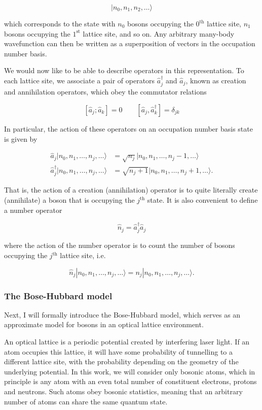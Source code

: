 \documentclass[11pt]{article}
\begin{document}
\[| n_0 ,n_1,n_2,\ldots \rangle\]

which corresponds to the state with \(n_0\) bosons occupying the
\(0^\text{th}\) lattice site, \(n_1\) bosons occupying the
\(1^\text{st}\) lattice site, and so on. Any arbitrary many-body
wavefunction can then be written as a superposition of vectors in the
occupation number basis.

We would now like to be able to describe operators in this
representation. To each lattice site, we associate a pair of operators
\(\hat a_j^\dagger\) and \(\hat a_j\), known as creation and
annihilation operators, which obey the commutator relations

\[[ \hat a_j ;  \hat a_k] = 0  \qquad [ \hat a_j, \hat a_k^\dagger] = \delta_{jk}\]

In particular, the action of these operators on an occupation number
basis state is given by

\begin{align}
\hat a_j | n_0,n_1, \ldots,n_j ,\ldots \rangle &= \sqrt{n_j} | n_0,n_1, \ldots,n_j-1 ,\ldots \rangle \\
\hat a_j^\dagger | n_0,n_1, \ldots,n_j ,\ldots \rangle &= \sqrt{n_j+1} | n_0,n_1, \ldots,n_j +1,\ldots \rangle .
\end{align}

That is, the action of a creation (annihilation) operator is to quite
literally create (annihilate) a boson that is occupying the
\(j^\text{th}\) state. It is also convenient to define a number operator

\[ \hat n_j  =  \hat a_j^\dagger \hat a_j \]

where the action of the number operator is to count the number of bosons
occupying the \(j^\text{th}\) lattice site, i.e.

\[\hat n_j | n_0,n_1, \ldots,n_j ,\ldots \rangle = n_j  | n_0,n_1, \ldots,n_j ,\ldots \rangle .\]

    \hypertarget{the-bose-hubbard-model}{%
\subsubsection{The Bose-Hubbard model}\label{the-bose-hubbard-model}}

    Next, I will formally introduce the Bose-Hubbard model, which serves as
an approximate model for bosons in an optical lattice environment.

An optical lattice is a periodic potential created by interfering laser
light. If an atom occupies this lattice, it will have some probability
of tunnelling to a different lattice site, with the probability
depending on the geometry of the underlying potential. In this work, we
will consider only bosonic atoms, which in principle is any atom with an
even total number of constituent electrons, protons and neutrons. Such
atoms obey bosonic statistics, meaning that an arbitrary number of atoms
can share the same quantum state.
\end{document}
